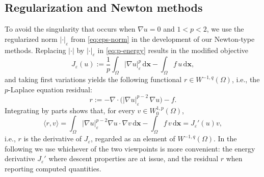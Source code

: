 \documentclass[11pt,pdflatex,sn-mathphys-num]{sn-jnl}
\theoremstyle{thmstyleone}%
\theoremstyle{thmstyletwo}%
\theoremstyle{thmstylethree}%
\newcommand{\bs}[1]{\ensuremath{\boldsymbol{#1}}}
\begin{document}
\subsection{Regularization and Newton methods}
\label{ssec:newton}
To avoid the singularity that occurs when $\nabla u = 0$ and $1 < p < 2$, we use the regularized norm $|\cdot|_\varepsilon$ from \eqref{eq:eps-norm} in the development of our Newton-type methods. Replacing $|\cdot|$ by $|\cdot|_\varepsilon$ in \eqref{eq:p-energy} results in the modified objective 
\begin{equation}\label{eq:J-eps}
  J_\varepsilon(u):=\frac1p\int_\Omega|\nabla u|_\varepsilon^{p}\,\mathrm{d}\bs x-\int_\Omega f\,u\,\mathrm{d}\bs x,
\end{equation}
and taking first variations yields the following functional $r\in W^{-1,q}(\Omega)$, i.e., the $p$-Laplace equation residual: 
\begin{equation}
\label{eq:p-laplace-gradient}
r:=-\nabla \cdot \bigl( |\nabla u|_\varepsilon^{p-2}\, \nabla u \bigr) - f .
\end{equation}
Integrating by parts shows that, for every $v\in W^{1,p}_0(\Omega)$,
\begin{equation}\label{eq:residual-is-derivative}
  \langle r,v\rangle
  =\int_\Omega |\nabla u|_\varepsilon^{p-2}\nabla u\cdot\nabla v\,\mathrm{d}\bs x
   -\int_\Omega f\,v\,\mathrm{d}\bs x
  = J_\varepsilon'(u)v,
\end{equation}
i.e., $r$ is the derivative of $J_\varepsilon$, regarded as an element of $W^{-1,q}(\Omega)$. In
the following we use whichever of the two viewpoints is more convenient: the energy
derivative $J_\varepsilon'$ where descent properties are at issue, and the residual $r$ when
reporting computed quantities.
\end{document}
